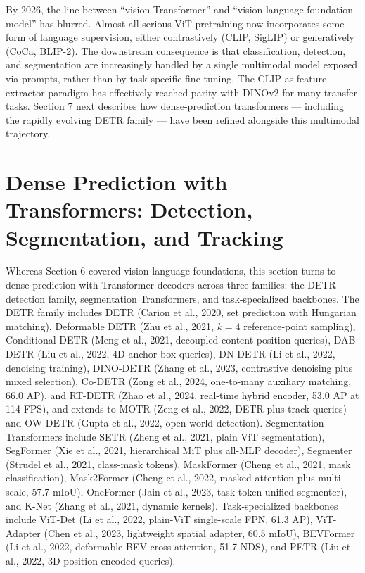 By 2026, the line between ``vision Transformer'' and ``vision-language foundation model'' has blurred. Almost all serious ViT pretraining now incorporates some form of language supervision, either contrastively (CLIP, SigLIP) or generatively (CoCa, BLIP-2). The downstream consequence is that classification, detection, and segmentation are increasingly handled by a single multimodal model exposed via prompts, rather than by task-specific fine-tuning. The CLIP-as-feature-extractor paradigm has effectively reached parity with DINOv2 for many transfer tasks. Section 7 next describes how dense-prediction transformers --- including the rapidly evolving DETR family --- have been refined alongside this multimodal trajectory.

\section{Dense Prediction with Transformers: Detection, Segmentation, and Tracking}\label{dense-prediction-with-transformers-detection-segmentation-and-tracking}

Whereas Section 6 covered vision-language foundations, this section turns to dense prediction with Transformer decoders across three families: the DETR detection family, segmentation Transformers, and task-specialized backbones. The DETR family includes DETR (Carion et al., 2020, set prediction with Hungarian matching), Deformable DETR (Zhu et al., 2021, \(k{=}4\) reference-point sampling), Conditional DETR (Meng et al., 2021, decoupled content-position queries), DAB-DETR (Liu et al., 2022, 4D anchor-box queries), DN-DETR (Li et al., 2022, denoising training), DINO-DETR (Zhang et al., 2023, contrastive denoising plus mixed selection), Co-DETR (Zong et al., 2024, one-to-many auxiliary matching, 66.0 AP), and RT-DETR (Zhao et al., 2024, real-time hybrid encoder, 53.0 AP at 114 FPS), and extends to MOTR (Zeng et al., 2022, DETR plus track queries) and OW-DETR (Gupta et al., 2022, open-world detection). Segmentation Transformers include SETR (Zheng et al., 2021, plain ViT segmentation), SegFormer (Xie et al., 2021, hierarchical MiT plus all-MLP decoder), Segmenter (Strudel et al., 2021, class-mask tokens), MaskFormer (Cheng et al., 2021, mask classification), Mask2Former (Cheng et al., 2022, masked attention plus multi-scale, 57.7 mIoU), OneFormer (Jain et al., 2023, task-token unified segmenter), and K-Net (Zhang et al., 2021, dynamic kernels). Task-specialized backbones include ViT-Det (Li et al., 2022, plain-ViT single-scale FPN, 61.3 AP), ViT-Adapter (Chen et al., 2023, lightweight spatial adapter, 60.5 mIoU), BEVFormer (Li et al., 2022, deformable BEV cross-attention, 51.7 NDS), and PETR (Liu et al., 2022, 3D-position-encoded queries).

